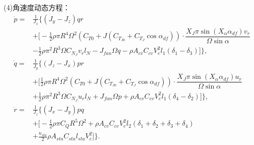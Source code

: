 (4)角速度动态方程：
\begin{equation}
    \label{eq:w_dynamic}
    \begin{aligned}
        \dot{p} = & \frac{1}{J_x} \biggl\{ (J_y - J_z)qr \\[4pt]
        &+ \biggl[ - \frac{1}{2}\rho \pi R^4 \Omega^2 (C_{T0} + J (C_{T_{J0}} + C_{T_J} \cos\alpha_{df})) \cdot \dfrac{X_J \pi \sin(X_\alpha \alpha_{df}) v_r}{\Omega \sin\alpha} \\[4pt]
        & - \frac{1}{2}\rho \pi^2 R^3 \Omega C_{N_J} v_r l_N - J_{{fan}} \Omega q - \rho A_{cv} C_{cv} V_e^2 l_1 (\delta_1 - \delta_3) \biggr] \biggr\}, \\[4pt]
        \dot{q} = & \frac{1}{J_y} \biggl\{(J_z - J_x)pr \\[4pt]
        &+ \biggl[  \frac{1}{2}\rho \pi R^4 \Omega^2 (C_{T0} + J (C_{T_{J0}} + C_{T_J} \cos\alpha_{df})) \cdot \dfrac{X_J \pi \sin(X_\alpha \alpha_{df}) u_r}{\Omega \sin\alpha} \\[4pt]
        & + \frac{1}{2}\rho \pi^2 R^3 \Omega C_{N_J} u_r l_N + J_{{fan}} \Omega p + \rho A_{cv} C_{cv} V_e^2 l_1 (\delta_4 - \delta_2) \biggr] \biggr\}, \\[4pt]
        \dot{r} = & \frac{1}{J_z} \biggl\{ (J_x - J_y)pq \\[4pt]
        &+\biggl[ - \frac{1}{2}\rho \pi C_Q R^5 \Omega^2  + \rho A_{cv} C_{cv} V_e^2 l_2 (\delta_1 + \delta_2 + \delta_3 + \delta_4) \\[4pt]
        & + \frac{n_{sta}}{2} \rho A_{sta} C_{sta} l_{sta} V_e^2 \biggr] \biggr\}.
    \end{aligned}
\end{equation}


